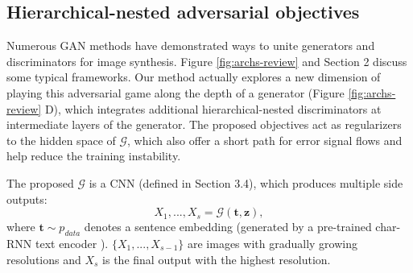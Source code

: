 \documentclass[10pt,twocolumn,letterpaper]{article}
\begin{document}
\subsection{Hierarchical-nested adversarial objectives}
Numerous GAN methods have demonstrated ways to unite generators and discriminators for image synthesis. Figure \ref{fig:archs-review} and Section 2 discuss some typical frameworks.
Our method actually explores a new dimension of playing this adversarial game along the depth of a generator (Figure \ref{fig:archs-review} D), which integrates additional hierarchical-nested discriminators at intermediate layers of the generator. 
The proposed objectives act as regularizers to the hidden space of $\mathcal{G}$, which also offer a short path for error signal flows and help reduce the training instability.

The proposed $\mathcal{G}$ is a CNN (defined in Section 3.4), which produces multiple side outputs:
\begin{equation}
\label{side}
X_1,..., X_s = \mathcal{G}(\bm t, \bm z), 
\end{equation}
where  $\bm t\sim p_{data}$ denotes a sentence embedding (generated by a pre-trained char-RNN text encoder \cite{reed2016generative}). $\{X_1,...,X_{s-1}\}$ are images with gradually growing resolutions and $X_s$ is the final output with the highest resolution.



\end{document}
